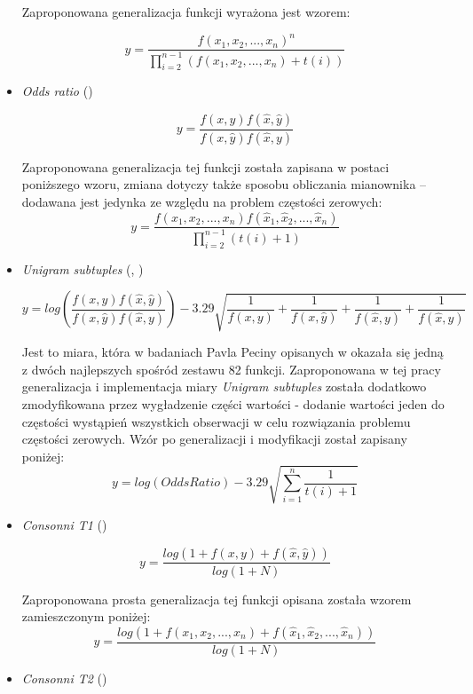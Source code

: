 \documentclass[11pt,a4paper]{llncs}
\begin{document}
\begin{itemize}
Zaproponowana generalizacja funkcji wyrażona jest wzorem:
\begin{center}
$$ y = \frac{f(x_{1}, x_{2}, ..., x_{n})^n}{\prod_{i=2}^{n - 1} (f(x_{1}, x_{2}, ..., x_{n}) + t(i))} $$
\end{center}


\item \emph{Odds ratio} (\cite[str. 18]{pecina_measures})

$$ y = \frac{f(x, y)f(\hat{x}, \hat{y})}{f(x, \hat{y})f(\hat{x}, y)} $$


Zaproponowana generalizacja tej funkcji została zapisana w postaci poniższego wzoru, zmiana dotyczy także sposobu obliczania mianownika -- dodawana jest jedynka ze względu na problem częstości zerowych:
$$ y = \frac{f(x_{1}, x_{2}, ..., x_{n})f(\hat{x}_{1}, \hat{x}_{2}, ..., \hat{x}_{n})}{\prod_{i = 2}^{n - 1}(t(i) + 1)} $$


\item \emph{Unigram subtuples} (\cite[str. 3]{coling}, \cite[str. 19]{pecina_measures})

$$ y = log (\frac{f(x, y)f(\hat{x}, \hat{y})}{f(x, \hat{y})f(\hat{x}, y)}) - 3.29 \sqrt{ \frac{1}{f(x, y)} + \frac{1}{f(x, \hat{y})} + \frac{1}{f(\hat{x}, y)} + \frac{1}{f(\hat{x}, \hat{y})} } $$

Jest to miara, która w badaniach Pavla Peciny opisanych w \cite[str. 5]{coling} okazała się jedną z dwóch najlepszych spośród zestawu 82 funkcji.
Zaproponowana w tej pracy generalizacja i implementacja miary \emph{Unigram subtuples} została dodatkowo zmodyfikowana przez wygładzenie części wartości - dodanie wartości jeden do częstości wystąpień wszystkich obserwacji w celu rozwiązania problemu częstości zerowych.
Wzór po generalizacji i modyfikacji został zapisany poniżej:
$$ y = log (OddsRatio) - 3.29 \sqrt{\sum_{i=1}^{n} \frac{1}{t(i) + 1} } $$



\item \emph{Consonni T1} (\cite[str. 4]{paradowski_beta})

$$ y = \frac{log(1 + f(x, y) + f(\hat{x}, \hat{y}))}{log(1 + N)} $$


Zaproponowana prosta generalizacja tej funkcji opisana została wzorem zamieszczonym poniżej:
$$ y = \frac{log(1 + f(x_{1}, x_{2}, ..., x_{n}) + f(\hat{x}_{1}, \hat{x}_{2}, ..., \hat{x}_{n}))}{log(1 + N)} $$


\item \emph{Consonni T2} (\cite[str. 4]{paradowski_beta})


\end{itemize}
\end{document}
